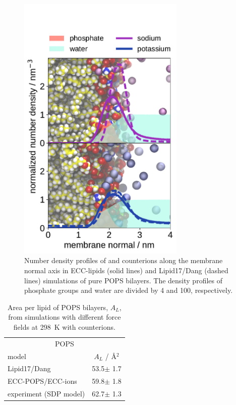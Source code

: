 \documentclass[journal=jpcbfk,manuscript=article]{achemso}
\begin{document}
\begin{figure}[hbp!] 
  \centering 
  \includegraphics[width=8cm]{../img/ecc_pops/density_profiles_na-k-counterions_wat_phos_compar_purePOPS_ecclipids-lipid17.pdf}
  \caption{\label{fig:POPS-counterions-dens}
    Number density profiles of  and  counterions along the membrane normal axis
    in ECC-lipids (solid lines) and Lipid17/Dang (dashed lines) simulations of pure POPS bilayers.  
    The density profiles of phosphate groups and water are divided by 4 and 100, respectively.  
  }
\end{figure}



\begin{table}[tb!] 
\centering
  \caption{Area per lipid of POPS bilayers, $A_L$, from simulations with different force fields at 298~K with  counterions. \label{tab:apls} } 
  \begin{tabular}{l|c } 
    \multicolumn{2}{c}{POPS} \\
    model          & $A_L$ / Å$^2$    \\ 
    \hline 
    Lipid17/Dang              & 53.5$\pm$ 1.7   \\ 
    ECC-POPS/ECC-ions         & 59.8$\pm$ 1.8   \\ 
    experiment (SDP model) \citep{kucerka14} & 62.7$\pm$ 1.3  \\ 
  \end{tabular} \\
\end{table} 
\end{document}
